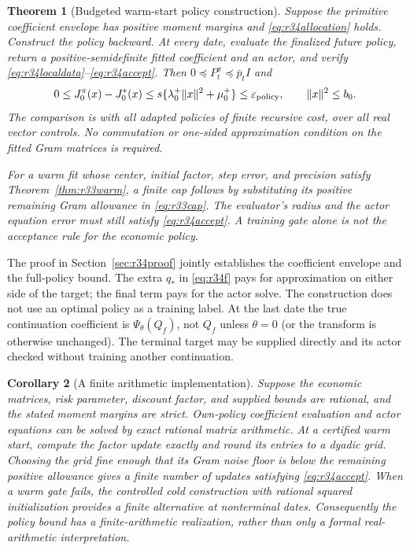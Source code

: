 \documentclass[ecta,nameyear,draft]{econsocart}
\newtheorem{theorem}{Theorem}
\newtheorem{corollary}[theorem]{Corollary}
\theoremstyle{definition}
\theoremstyle{remark}
\begin{document}
\begin{theorem}[Budgeted warm-start policy construction]
\label{thm:r34robust}
Suppose the primitive coefficient envelope has positive moment margins and
\eqref{eq:r34allocation} holds. Construct the policy backward. At every date,
evaluate the finalized future policy, return a positive-semidefinite fitted
coefficient and an actor, and verify \eqref{eq:r34localdata}--\eqref{eq:r34accept}.
Then $0\preceq P_t^\pi\preceq\bar p_tI$ and
\begin{equation}\label{eq:r34policybound}
 0\leq J_0^\pi(x)-J_0^*(x)
 \leq s\{\lambda_0^+\|x\|^2+\mu_0^+\}
 \leq\varepsilon_{\rm policy},\qquad \|x\|^2\leq b_0.
\end{equation}
The comparison is with all adapted policies of finite recursive cost, over
all real vector controls. No commutation or one-sided approximation condition
on the fitted Gram matrices is required.

For a warm fit whose center, initial factor, step error, and precision satisfy
Theorem~\ref{thm:r33warm}, a finite cap follows by substituting its positive
remaining Gram allowance in \eqref{eq:r33cap}. The evaluator's radius and the
actor equation error must still satisfy \eqref{eq:r34accept}. A training gate
alone is not the acceptance rule for the economic policy.
\end{theorem}

The proof in Section~\ref{sec:r34proof} jointly establishes the coefficient
envelope and the full-policy bound. The extra $q_*$ in \eqref{eq:r34f} pays
for approximation on either side of the target; the final term pays for the
actor solve. The construction does not use an optimal policy as a training
label. At the last date the true continuation coefficient is
$\Psi_\theta(Q_f)$, not $Q_f$ unless $\theta=0$ (or the transform is otherwise
unchanged). The terminal target may be supplied directly and its actor
checked without training another continuation.

\begin{corollary}[A finite arithmetic implementation]\label{cor:r34finite}
Suppose the economic matrices, risk parameter, discount factor, and supplied
bounds are rational, and the stated moment margins are strict. Own-policy
coefficient evaluation and actor equations can be solved by exact rational
matrix arithmetic. At a certified warm start, compute the factor update
exactly and round its entries to a dyadic grid. Choosing the grid fine enough
that its Gram noise floor is below the remaining positive allowance gives a
finite number of updates satisfying \eqref{eq:r34accept}. When a warm gate
fails, the controlled cold construction with rational squared initialization
provides a finite alternative at nonterminal dates. Consequently the policy
bound has a finite-arithmetic realization, rather than only a formal
real-arithmetic interpretation.
\end{corollary}
\end{document}
